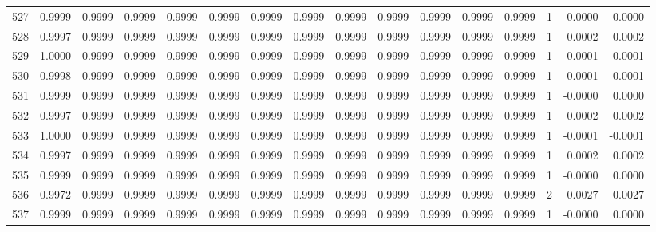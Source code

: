 \begin{tabular}{lrrrrrrrrrrrrrrr}
527 &      0.9999 &  0.9999 &  0.9999 &  0.9999 &  0.9999 &  0.9999 &  0.9999 &  0.9999 &  0.9999 &  0.9999 &   0.9999 &     0.9999 &      1 &                   -0.0000 &                     0.0000 \\
528 &      0.9997 &  0.9999 &  0.9999 &  0.9999 &  0.9999 &  0.9999 &  0.9999 &  0.9999 &  0.9999 &  0.9999 &   0.9999 &     0.9999 &      1 &                    0.0002 &                     0.0002 \\
529 &      1.0000 &  0.9999 &  0.9999 &  0.9999 &  0.9999 &  0.9999 &  0.9999 &  0.9999 &  0.9999 &  0.9999 &   0.9999 &     0.9999 &      1 &                   -0.0001 &                    -0.0001 \\
530 &      0.9998 &  0.9999 &  0.9999 &  0.9999 &  0.9999 &  0.9999 &  0.9999 &  0.9999 &  0.9999 &  0.9999 &   0.9999 &     0.9999 &      1 &                    0.0001 &                     0.0001 \\
531 &      0.9999 &  0.9999 &  0.9999 &  0.9999 &  0.9999 &  0.9999 &  0.9999 &  0.9999 &  0.9999 &  0.9999 &   0.9999 &     0.9999 &      1 &                   -0.0000 &                     0.0000 \\
532 &      0.9997 &  0.9999 &  0.9999 &  0.9999 &  0.9999 &  0.9999 &  0.9999 &  0.9999 &  0.9999 &  0.9999 &   0.9999 &     0.9999 &      1 &                    0.0002 &                     0.0002 \\
533 &      1.0000 &  0.9999 &  0.9999 &  0.9999 &  0.9999 &  0.9999 &  0.9999 &  0.9999 &  0.9999 &  0.9999 &   0.9999 &     0.9999 &      1 &                   -0.0001 &                    -0.0001 \\
534 &      0.9997 &  0.9999 &  0.9999 &  0.9999 &  0.9999 &  0.9999 &  0.9999 &  0.9999 &  0.9999 &  0.9999 &   0.9999 &     0.9999 &      1 &                    0.0002 &                     0.0002 \\
535 &      0.9999 &  0.9999 &  0.9999 &  0.9999 &  0.9999 &  0.9999 &  0.9999 &  0.9999 &  0.9999 &  0.9999 &   0.9999 &     0.9999 &      1 &                   -0.0000 &                     0.0000 \\
536 &      0.9972 &  0.9999 &  0.9999 &  0.9999 &  0.9999 &  0.9999 &  0.9999 &  0.9999 &  0.9999 &  0.9999 &   0.9999 &     0.9999 &      2 &                    0.0027 &                     0.0027 \\
537 &      0.9999 &  0.9999 &  0.9999 &  0.9999 &  0.9999 &  0.9999 &  0.9999 &  0.9999 &  0.9999 &  0.9999 &   0.9999 &     0.9999 &      1 &                   -0.0000 &                     0.0000 \\

\end{tabular}
